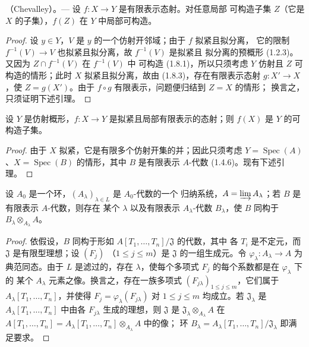 \begin{theorem}[1.8.4]
\label{IV.1.8.4-fr}
\textup{（Chevalley）}。--- 设 $f:X\to Y$ 是有限表示态射。对任意局部
可构造子集 $Z$（它是 $X$ 的子集），$f(Z)$ 在 $Y$ 中局部可构造。
\end{theorem}

\begin{proof}
设 $y\in Y$，$V$ 是 $y$ 的一个仿射开邻域；由于 $f$ 拟紧且拟分离，
它的限制 $f^{-1}(V)\to V$ 也拟紧且拟分离，故 $f^{-1}(V)$ 是拟紧且
拟分离的预概形 (1.2.3)。又因为 $Z\cap f^{-1}(V)$ 在 $f^{-1}(V)$ 中
可构造 (1.8.1)，所以只须考虑 $Y$ 仿射且 $Z$ 可构造的情形；此时 $X$
拟紧且拟分离，故由 (1.8.3)，存在有限表示态射 $g:X'\to X$，使
$Z=g(X')$。由于 $f\circ g$ 有限表示，问题便归结到 $Z=X$ 的情形；
换言之，只须证明下述引理。
\end{proof}

\begin{lemma}[1.8.4.1]
\label{IV.1.8.4.1-fr}
设 $Y$ 是仿射概形，$f:X\to Y$ 是拟紧且局部有限表示的态射；则 $f(X)$
是 $Y$ 的可构造子集。
\end{lemma}

\begin{proof}
由于 $X$ 拟紧，它是有限多个仿射开集的并；因此只须考虑
$Y=\operatorname{Spec}(A)$、$X=\operatorname{Spec}(B)$ 的情形，其中 $B$
是有限表示 $A$-代数 (1.4.6)。现有下述引理。
\end{proof}

\begin{lemma}[1.8.4.2]
\label{IV.1.8.4.2-fr}
设 $A_0$ 是一个环，$(A_\lambda)_{\lambda\in L}$ 是 $A_0$-代数的一个
归纳系统，$A=\varinjlim A_\lambda$；若 $B$ 是有限表示 $A$-代数，则存在
某个 $\lambda$ 以及有限表示 $A_\lambda$-代数 $B_\lambda$，使 $B$ 同构于
$B_\lambda\otimes_{A_\lambda}A$。
\end{lemma}

\begin{proof}
依假设，$B$ 同构于形如 $A[T_1,\ldots,T_n]/\mathfrak J$ 的代数，其中
各 $T_i$ 是不定元，而 $\mathfrak J$ 是有限型理想；设 $(F_j)$
（$1\leq j\leq m$）是 $\mathfrak J$ 的一组生成元。令
$\varphi_\lambda:A_\lambda\to A$ 为典范同态。由于 $L$ 是滤过的，存在
$\lambda$，使每个多项式 $F_j$ 的每个系数都是在 $\varphi_\lambda$ 下的
某个 $A_\lambda$ 元素之像。换言之，存在一族多项式
$(F_{j\lambda})_{1\leq j\leq m}$，它们属于
$A_\lambda[T_1,\ldots,T_n]$，并使得 $F_j=\varphi_\lambda(F_{j\lambda})$
对 $1\leq j\leq m$ 均成立。若 $\mathfrak J_\lambda$ 是
$A_\lambda[T_1,\ldots,T_n]$ 中由各 $F_{j\lambda}$ 生成的理想，则
$\mathfrak J$ 是 $\mathfrak J_\lambda\otimes_{A_\lambda}A$ 在
$A[T_1,\ldots,T_n]=A_\lambda[T_1,\ldots,T_n]\otimes_{A_\lambda}A$ 中的像；
环 $B_\lambda=A_\lambda[T_1,\ldots,T_n]/\mathfrak J_\lambda$ 即满足要求。
\end{proof}

